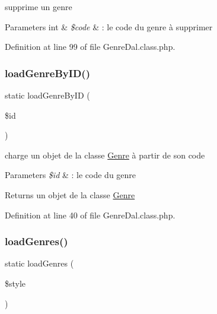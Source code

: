 supprime un genre 
\begin{DoxyParams}[1]{Parameters}
int & {\em \$code} & \+: le code du genre à supprimer \\
\hline
\end{DoxyParams}


Definition at line 99 of file Genre\+Dal.\+class.\+php.

\mbox{\label{class_genre_dal_accf9d9f0e125c11bf0f771c169a0b582}} 
\subsubsection{\texorpdfstring{load\+Genre\+By\+I\+D()}{loadGenreByID()}}
{\footnotesize\ttfamily static load\+Genre\+By\+ID (\begin{DoxyParamCaption}\item[{}]{\$id }\end{DoxyParamCaption})\hspace{0.3cm}{\ttfamily [static]}}

charge un objet de la classe \hyperlink{class_genre}{Genre} à partir de son code 
\begin{DoxyParams}{Parameters}
{\em \$id} & \+: le code du genre \\
\hline
\end{DoxyParams}
\begin{DoxyReturn}{Returns}
un objet de la classe \hyperlink{class_genre}{Genre} 
\end{DoxyReturn}


Definition at line 40 of file Genre\+Dal.\+class.\+php.

\mbox{\label{class_genre_dal_a2f593b6941ef3a8e74cbade10d97935b}} 
\subsubsection{\texorpdfstring{load\+Genres()}{loadGenres()}}
{\footnotesize\ttfamily static load\+Genres (\begin{DoxyParamCaption}\item[{}]{\$style }\end{DoxyParamCaption})\hspace{0.3cm}{\ttfamily [static]}}


